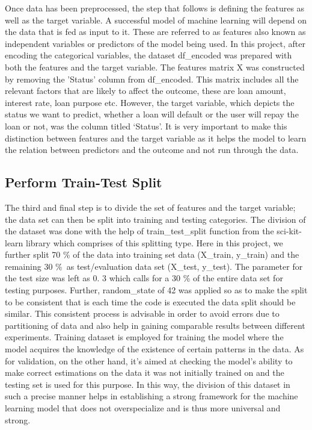\documentclass[12pt, a4paper,oneside]{book}
\numberwithin{equation}{section}
\begin{document}
Once data has been preprocessed, the step that follows is defining the features as well as the target variable. A successful model of machine learning will depend on the data that is fed as input to it. These are referred to as features also known as independent variables or predictors of the model being used. In this project, after encoding the categorical variables, the dataset df\_encoded was prepared with both the features and the target variable. The features matrix X was constructed by removing the 'Status' column from df\_encoded. This matrix includes all the relevant factors that are likely to affect the outcome, these are loan amount, interest rate, loan purpose etc. However, the target variable, which depicts the status we want to predict, whether a loan will default or the user will repay the loan or not, was the column titled ‘Status’. It is very important to make this distinction between features and the target variable as it helps the model to learn the relation between predictors and the outcome and not run through the data.

\subsection{Perform Train-Test Split}

The third and final step is to divide the set of features and the target variable; the data set can then be split into training and testing categories. The division of the dataset was done with the help of train\_test\_split function from the sci-kit-learn library which comprises of this splitting type. Here in this project, we further split 70 \% of the data into training set data (X\_train, y\_train) and the remaining 30 \%\ as test/evaluation data set (X\_test, y\_test). The parameter for the test size was left as 0. 3 which calls for a 30 \% of the entire data set for testing purposes. Further, random\_state of 42 was applied so as to make the split to be consistent that is each time the code is executed the data split should be similar. This consistent process is advisable in order to avoid errors due to partitioning of data and also help in gaining comparable results between different experiments. Training dataset is employed for training the model where the model acquires the knowledge of the existence of certain patterns in the data. As for validation, on the other hand, it’s aimed at checking the model’s ability to make correct estimations on the data it was not initially trained on and the testing set is used for this purpose. In this way, the division of this dataset in such a precise manner helps in establishing a strong framework for the machine learning model that does not overspecialize and is thus more universal and strong. 
\end{document}
